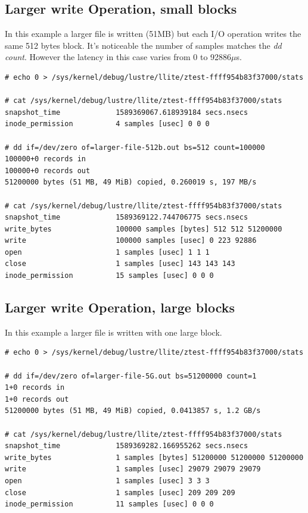 \documentclass{article}
\begin{document}
\subsection{Larger write Operation, small blocks}
In this example a larger file is written (51MB) but each I/O operation writes the same 512 bytes block. It's noticeable the number of samples matches the \textit{dd count}. However the latency in this case varies from 0 to 92886$\mu$s. 
\begin{verbatim}
# echo 0 > /sys/kernel/debug/lustre/llite/ztest-ffff954b83f37000/stats

# cat /sys/kernel/debug/lustre/llite/ztest-ffff954b83f37000/stats
snapshot_time             1589369067.618939184 secs.nsecs
inode_permission          4 samples [usec] 0 0 0

# dd if=/dev/zero of=larger-file-512b.out bs=512 count=100000
100000+0 records in
100000+0 records out
51200000 bytes (51 MB, 49 MiB) copied, 0.260019 s, 197 MB/s

# cat /sys/kernel/debug/lustre/llite/ztest-ffff954b83f37000/stats
snapshot_time             1589369122.744706775 secs.nsecs
write_bytes               100000 samples [bytes] 512 512 51200000
write                     100000 samples [usec] 0 223 92886
open                      1 samples [usec] 1 1 1
close                     1 samples [usec] 143 143 143
inode_permission          15 samples [usec] 0 0 0

\end{verbatim}
\subsection{Larger write Operation, large blocks}
In this example a larger file is written with one large block.  
\begin{verbatim}
# echo 0 > /sys/kernel/debug/lustre/llite/ztest-ffff954b83f37000/stats

# dd if=/dev/zero of=larger-file-5G.out bs=51200000 count=1
1+0 records in
1+0 records out
51200000 bytes (51 MB, 49 MiB) copied, 0.0413857 s, 1.2 GB/s

# cat /sys/kernel/debug/lustre/llite/ztest-ffff954b83f37000/stats
snapshot_time             1589369282.166955262 secs.nsecs
write_bytes               1 samples [bytes] 51200000 51200000 51200000
write                     1 samples [usec] 29079 29079 29079
open                      1 samples [usec] 3 3 3
close                     1 samples [usec] 209 209 209
inode_permission          11 samples [usec] 0 0 0
\end{verbatim}
\end{document}
